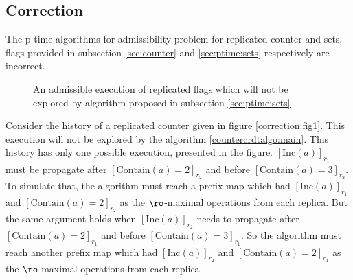 \subsection{Correction}
The p-time algorithms for admissibility problem for replicated counter and sets, flags provided in subsection \ref{sec:counter} and \ref{sec:ptime:sets} respectively are incorrect.

\begin{figure}
    \centering


    \begin{minipage}{\textwidth}
        \centering
        \caption{An admissible execution of replicated flags which will not be explored by algorithm proposed in subsection \ref{sec:ptime:sets}}
        \label{correction:fig2}
    \end{minipage}
    \end{figure}

Consider the history of a replicated counter given in figure \ref{correction:fig1}. This execution will not be explored by the algorithm \ref{countercrdtalgo:main}. This history has only one possible execution, presented in the figure. $[\mathrm{Inc}(a)]_{r_1}$ must be propagate after $[\mathrm{Contain}(a) = 2]_{r_2}$ and before $[\mathrm{Contain}(a) = 3]_{r_2}$. To simulate that, the algorithm must reach a prefix map which had $[\mathrm{Inc}(a)]_{r_1}$ and $[\mathrm{Contain}(a) = 2]_{r_2}$ as the $\ro$-maximal operations from each replica. But the same argument holds when $[\mathrm{Inc}(a)]_{r_2}$ needs to propagate after $[\mathrm{Contain}(a) = 2]_{r_1}$ and before $[\mathrm{Contain}(a) = 3]_{r_1}$. So the algorithm must reach another prefix map which had $[\mathrm{Inc}(a)]_{r_2}$ and $[\mathrm{Contain}(a) = 2]_{r_1}$ as the $\ro$-maximal operations from each replica.

